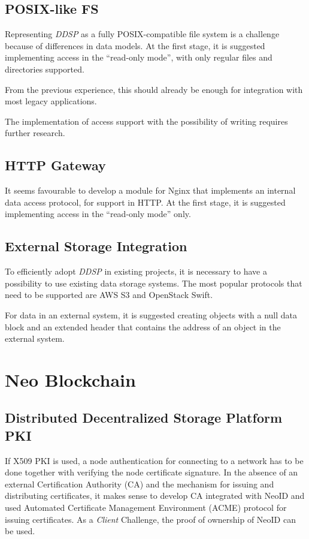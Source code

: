 \documentclass[a4paper, 11pt]{article}
\begin{document}
\subsection{POSIX-like FS}

Representing \textit{DDSP} as a fully POSIX-compatible
file system is a challenge because of differences in data models. At the first
stage, it is suggested implementing access in the ``read-only mode'', with only
regular files and directories supported.

From the previous experience, this should already be enough for integration with
most legacy applications.

The implementation of access support with the possibility of writing requires
further research.

\subsection{HTTP Gateway}

It seems favourable to develop a module for Nginx that implements an internal
data access protocol, for support in HTTP. At the first stage, it is suggested
implementing access in the ``read-only mode'' only.

\subsection{External Storage Integration}

To efficiently adopt \textit{DDSP} in existing projects,
it is necessary to have a possibility to use existing data storage systems. The
most popular protocols that need to be supported are AWS S3 and OpenStack Swift.

For data in an external system, it is suggested creating objects with a null
data block and an extended header that contains the address of an object in the
external system.

\section{Neo Blockchain}

\subsection{Distributed Decentralized Storage Platform PKI}

If X509 PKI is used, a node authentication for connecting to a network has to be
done together with verifying the node certificate signature. In the absence of
an external Certification Authority (CA) and the mechanism for issuing and
distributing certificates, it makes sense to develop CA integrated with NeoID
and used Automated Certificate Management Environment (ACME) protocol for
issuing certificates. As a \textit{Client} Challenge, the proof of ownership of NeoID can
be used.
\end{document}
